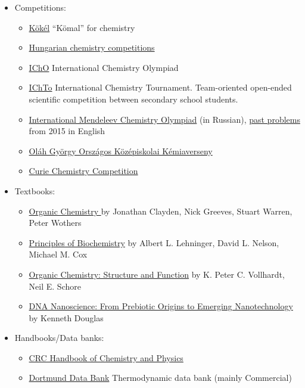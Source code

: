 \documentclass{article}
\begin{document}
\begin{itemize}
    \item Competitions:
    \begin{itemize}
        \item \href{http://www.kokel.mke.org.hu/}{Kökél} ``Kömal'' for chemistry
        \item \href{http://kemia.apaczai.elte.hu/versenyek/index.htm}{Hungarian chemistry competitions}
        \item \href{https://www.ichosc.org/}{IChO} International Chemistry Olympiad
        \item \href{http://ichto.org/en/about/}{IChTo} International Chemistry Tournament.  Team-oriented open-ended scientific competition between secondary school students.
        \item \href{http://www.chem.msu.ru/rus/olimp/welcome.html}{International Mendeleev Chemistry Olympiad} (in Russian), \href{https://www.eko.ut.ee/mko/}{past problems} from 2015 in English 
        \item \href{https://olahverseny.szasz.bme.hu/}{Oláh György Országos Középiskolai Kémiaverseny}
        \item \href{http://curiealapitvany.hu/}{Curie Chemistry Competition}
    \end{itemize}
    \item Textbooks:
    \begin{itemize}
        \item \href{https://www.goodreads.com/en/book/show/1957892.Organic_Chemistry}{Organic Chemistry }  by Jonathan Clayden, Nick Greeves, Stuart Warren, Peter Wothers
        \item \href{https://www.goodreads.com/book/show/239513.Principles_of_Biochemistry}{Principles of Biochemistry}  by Albert L. Lehninger, David L. Nelson, Michael M. Cox
        \item \href{https://www.goodreads.com/book/show/209165.Organic_Chemistry}{Organic Chemistry: Structure and Function} by K. Peter C. Vollhardt, Neil E. Schore
        \item \href{https://www.goodreads.com/book/show/30413521-dna-nanoscience}{DNA Nanoscience: From Prebiotic Origins to Emerging Nanotechnology} by Kenneth Douglas
    \end{itemize}
    \item Handbooks/Data banks:
    \begin{itemize}
        \item \href{https://en.wikipedia.org/wiki/CRC_Handbook_of_Chemistry_and_Physics}{CRC Handbook of Chemistry and Physics}
        \item \href{http://www.ddbst.com/}{Dortmund Data Bank} Thermodynamic data bank (mainly Commercial)
    \end{itemize}
    

\end{itemize}
\end{document}
